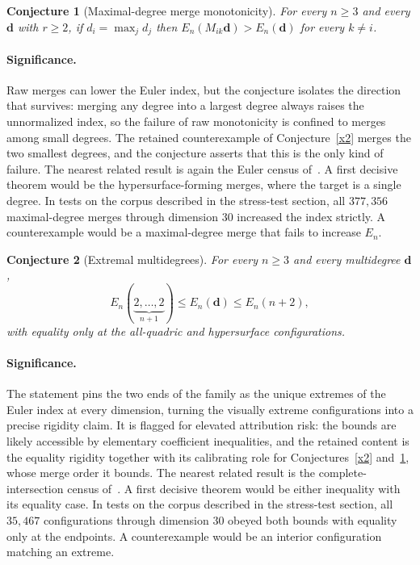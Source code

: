\documentclass[11pt]{article}
\newtheorem{conjecture}{Conjecture}
\theoremstyle{definition}
\begin{document}
\begin{conjecture}[Maximal-degree merge monotonicity]\label{x3}
For every $n\ge3$ and every $\mathbf d$ with $r\ge2$, if $d_i=\max_jd_j$ then $E_n(M_{ik}\mathbf d)>E_n(\mathbf d)$ for every $k\ne i$.
\end{conjecture}

\paragraph{Significance.}
Raw merges can lower the Euler index, but the conjecture isolates the direction that survives: merging any degree into a largest degree always raises the unnormalized index, so the failure of raw monotonicity is confined to merges among small degrees.  The retained counterexample of Conjecture~\ref{x2} merges the two smallest degrees, and the conjecture asserts that this is the only kind of failure.  The nearest related result is again the Euler census of~\cite{He21}.  A first decisive theorem would be the hypersurface-forming merges, where the target is a single degree.  In tests on the corpus described in the stress-test section, all $377{,}356$ maximal-degree merges through dimension $30$ increased the index strictly.  A counterexample would be a maximal-degree merge that fails to increase $E_n$.

\begin{conjecture}[Extremal multidegrees]\label{x4}
For every $n\ge3$ and every multidegree $\mathbf d$,
\[
E_n(\underbrace{2,\ldots,2}_{n+1})\le E_n(\mathbf d)\le E_n(n+2),
\]
with equality only at the all-quadric and hypersurface configurations.
\end{conjecture}

\paragraph{Significance.}
The statement pins the two ends of the family as the unique extremes of the Euler index at every dimension, turning the visually extreme configurations into a precise rigidity claim.  It is flagged for elevated attribution risk: the bounds are likely accessible by elementary coefficient inequalities, and the retained content is the equality rigidity together with its calibrating role for Conjectures~\ref{x2} and~\ref{x3}, whose merge order it bounds.  The nearest related result is the complete-intersection census of~\cite{He21}.  A first decisive theorem would be either inequality with its equality case.  In tests on the corpus described in the stress-test section, all $35{,}467$ configurations through dimension $30$ obeyed both bounds with equality only at the endpoints.  A counterexample would be an interior configuration matching an extreme.
\end{document}
